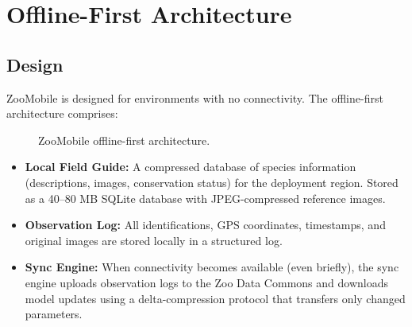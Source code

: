 \section{Offline-First Architecture}

\label{sec:offline}

\subsection{Design}

ZooMobile is designed for environments with no connectivity.
The offline-first architecture comprises:

\begin{figure}[H]
\centering
{}
\caption{ZooMobile offline-first architecture.}
\label{fig:offline}
\end{figure}

\begin{itemize}[leftmargin=*]
    \item \textbf{Local Field Guide:} A compressed database of species information (descriptions, images, conservation status) for the deployment region. Stored as a 40--80 MB SQLite database with JPEG-compressed reference images.
    \item \textbf{Observation Log:} All identifications, GPS coordinates, timestamps, and original images are stored locally in a structured log.
    \item \textbf{Sync Engine:} When connectivity becomes available (even briefly), the sync engine uploads observation logs to the Zoo Data Commons and downloads model updates using a delta-compression protocol that transfers only changed parameters.
\end{itemize}

